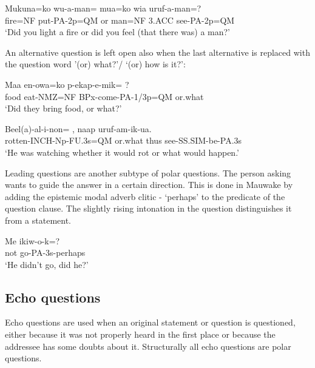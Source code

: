 \ea%
\label{ex:x1186}
\gll Mukuna=ko  wu-a-man=    mua=ko  wia  uruf-a-man=? \\
fire=NF  put-PA-2p=QM  or  man=NF  3.ACC  see-PA-2p=QM      \\
\glt `Did you light a fire or did you feel (that there was) a man?'
\z





An alternative question is left open also when the last alternative is replaced with the question word  '(or) what?'/ `(or) how is it?':

\ea%
\label{ex:x1350}
\gll Maa  en-owa=ko  p-ekap-e-mik=  ? \\
food  eat-NMZ=NF  BPx-come-PA-1/3p=QM  or.what      \\
\glt `Did they bring food, or what?'
\z





\ea%
\label{ex:x1351}
\gll Beel(a)-al-i-non=  ,  naap  uruf-am-ik-ua. \\
rotten-INCH-Np-FU.3s=QM  or.what  thus  see-SS.SIM-be-PA.3s      \\
\glt `He was watching whether it would rot or what would happen.'
\z





Leading questions are another subtype of polar questions. The person asking wants to guide the answer in a certain direction. This is done in Mauwake by adding the epistemic modal adverb clitic - `perhaps' to the predicate of the question clause. The slightly rising intonation in the question distinguishes it from a statement. 

\ea%
\label{ex:x1349}
\gll Me  ikiw-o-k=? \\
not  go-PA-3s-perhaps      \\
\glt `He didn't go, did he?'
\z




\subsection{Echo questions}
\hypertarget{RefHeading22781935131865}{}
Echo questions are used when an original statement or question is questioned, either because it was not properly heard in the first place or because the addressee has some doubts about it. Structurally all echo questions are polar questions.

